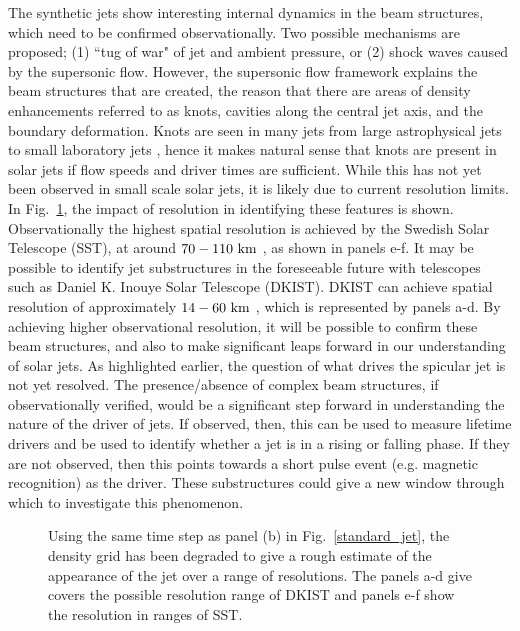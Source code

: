 %
The synthetic jets show interesting internal dynamics in the beam structures, which need to be confirmed observationally. Two possible mechanisms are proposed; (1) ``tug of war" of jet and ambient pressure, or (2) shock waves caused by the supersonic flow. However, the supersonic flow framework explains the beam structures that are created, the reason that there are areas of density enhancements referred to as knots, cavities along the central jet axis, and the boundary deformation. Knots are seen in many jets from large astrophysical jets \citep{van_Putten_1996ApJ467L57V, DeGouveiaDalPino2005, Hada2013ApJ77570H, Cohen2014ApJ787151C, Hervet2017AnA606A103H} to small laboratory jets \citep{Menon2010, Edgington-Mitchell2014, Ono2014}, hence it makes natural sense that knots are present in solar jets if flow speeds and driver times are sufficient. While this has not yet been observed in small scale solar jets, it is likely due to current resolution limits. In Fig.~\ref{degrid}, the impact of resolution in identifying these features is shown. Observationally the highest spatial resolution is achieved by the Swedish Solar Telescope (SST), at around $70-110~\rm{km}$ \citep{Scharmer2003SPIE,Berger2003ApJ}, as shown in panels e-f. It may be possible to identify jet substructures in the foreseeable future with telescopes such as Daniel K. Inouye Solar Telescope (DKIST). DKIST can achieve spatial resolution of approximately $14-60~\rm{km}$ \citep{Rast2020arXiv,Rimmele2020SoPh}, which is represented by panels a-d. By achieving higher observational resolution, it will be possible to confirm these beam structures, and also to make significant leaps forward in our understanding of solar jets. \np
%
As highlighted earlier, the question of what drives the spicular jet is not yet resolved. The presence/absence of complex beam structures, if observationally verified, would be a significant step forward in understanding the nature of the driver of jets. If observed, then, this can be used to measure lifetime drivers and be used to identify whether a jet is in a rising or falling phase. If they are not observed, then this points towards a short pulse event (e.g. magnetic recognition) as the driver. These substructures could give a new window through which to investigate this phenomenon.
\begin{figure}
\captionsetup[subfigure]{labelformat=empty}
\centering
{}
\caption{Using the same time step as panel (b) in Fig.~\ref{standard_jet}, the density grid has been degraded to give a rough estimate of the appearance of the jet over a range of resolutions. The panels a-d give covers the possible resolution range of DKIST and panels e-f show the resolution in ranges of SST.}
\label{degrid}
\end{figure}